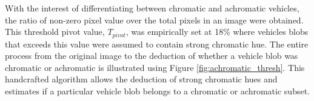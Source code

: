 With the interest of differentiating between chromatic and achromatic vehicles, the ratio of non-zero pixel value over the total pixels in an image were obtained. This threshold pivot value, $T_{pivot}$, was empirically set at 18\% where vehicles blobs that exceeds this value were assumed to contain strong chromatic hue. The entire process from the original image to the deduction of whether a vehicle blob was chromatic or achromatic is illustrated using Figure \ref{fig:achromatic_thresh}. This handcrafted algorithm allows the deduction of strong chromatic hues and estimates if a particular vehicle blob belongs to a chromatic or achromatic subset. 


